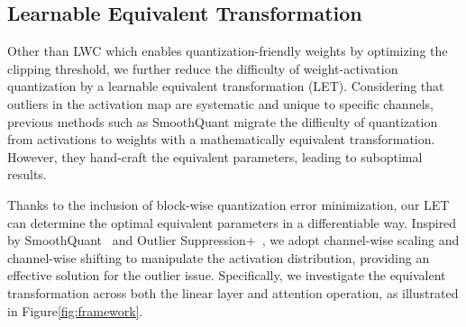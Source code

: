 \documentclass{article} %
\begin{document}
\subsection{Learnable Equivalent Transformation}\label{sec:LET}
Other than LWC which enables quantization-friendly weights by optimizing the clipping threshold, we further reduce the difficulty of weight-activation quantization by a learnable equivalent transformation (LET). 
%
Considering that outliers in the activation map are systematic and unique to specific channels, previous methods such as SmoothQuant \citep{smoothquant} migrate the difficulty of quantization from activations to weights with a mathematically equivalent transformation. However, they hand-craft the equivalent parameters, leading to suboptimal results.

Thanks to the inclusion of block-wise quantization error minimization, our LET can determine the optimal equivalent parameters in a differentiable way. 
%
Inspired by SmoothQuant~\citep{smoothquant} and Outlier Suppression+~\citep{outlier-plus}, we adopt channel-wise scaling and channel-wise shifting to manipulate the activation distribution, providing an effective solution for the outlier issue.
%
Specifically, we investigate the equivalent transformation across both the linear layer and attention operation, as illustrated in Figure\ref{fig:framework}.
\end{document}
